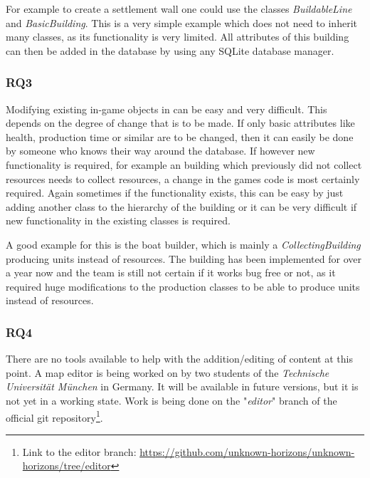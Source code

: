 For example to create a settlement wall one could use the classes \textit{BuildableLine} and
\textit{BasicBuilding}. This is a very simple example which does not need to inherit many classes, as its functionality
is very limited. All attributes of this building can then be added in the database by using any SQLite database manager.

\subsubsection{RQ3}
Modifying existing in-game objects in \UH{} can be easy and very difficult. This depends on the degree of
change that is to be made. If only basic attributes like health, production time or similar are to be changed, then it
can easily be done by someone who knows their way around the database. If however new functionality is required, for
example an building which previously did not collect resources needs to collect resources, a change in the games code is
most certainly required. Again sometimes if the functionality exists, this can be easy by just adding another class to
the hierarchy of the building or it can be very difficult if new functionality in the existing classes is required.

A good example for this is the boat builder, which is mainly a \textit{CollectingBuilding} producing units instead of
resources. The building has been implemented for over a year now and the team is still not certain if it works bug free
or not, as it required huge modifications to the production classes to be able to produce units instead of resources.

\subsubsection{RQ4}
There are no tools available to help with the addition/editing of content at this point. A map editor is being worked on
by two students of the \textit{Technische Universität München} in Germany. It will be available in future versions, but
it is not yet in a working state. Work is being done on the "\textit{editor}" branch of the official \UH{} git
repository\footnote{Link to the editor branch: \url{https://github.com/unknown-horizons/unknown-horizons/tree/editor}}.

